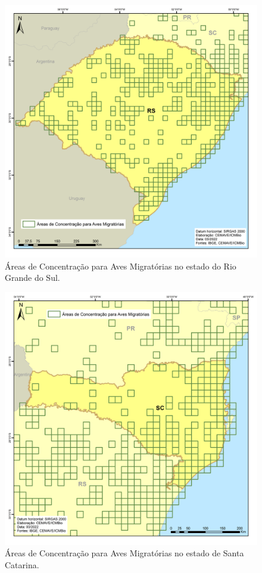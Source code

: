 \documentclass[
  oneside]{scrbook}
\begin{document}
\begin{figure}[H]

{\centering \includegraphics[width=0.75\linewidth]{imagens/cap07/Figura_7.36_RS} 

}

\caption{Áreas de Concentração para Aves Migratórias no estado do Rio Grande do Sul.}\label{fig:56}
\end{figure}

\begin{figure}[H]

{\centering \includegraphics[width=0.75\linewidth]{imagens/cap07/Figura_7.37_SC} 

}

\caption{Áreas de Concentração para Aves Migratórias no estado de Santa Catarina.}\label{fig:57}
\end{figure}
\end{document}
